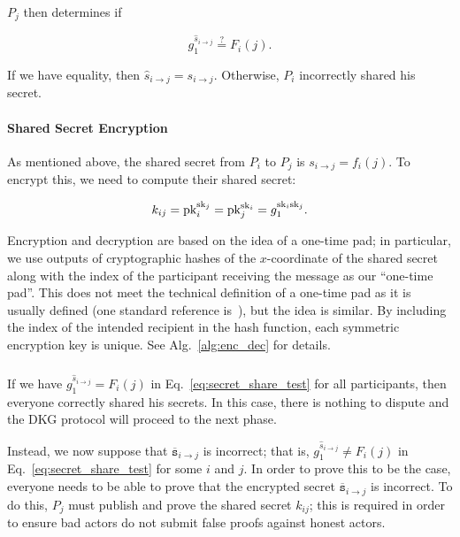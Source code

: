 \noindent
$P_{j}$ then determines if

\begin{equation}
    g_{1}^{\hat{s}_{i\to j}} \overset{?}{=} F_{i}(j).
    \label{eq:secret_share_test}
\end{equation}

\noindent
If we have equality, then $\hat{s}_{i\to j} = s_{i\to j}$.
Otherwise, $P_{i}$ incorrectly shared his secret.

\paragraph{Shared Secret Encryption}
\label{par:secret_enc}

As mentioned above, the shared secret from
$P_{i}$ to $P_{j}$ is $s_{i\to j} = f_{i}(j)$.
To encrypt this, we need to compute their shared secret:

\begin{equation}
    k_{ij} = \textrm{pk}_{i}^{\textrm{sk}_{j}} = \textrm{pk}_{j}^{\textrm{sk}_{i}} =
    g_{1}^{\textrm{sk}_{i}\textrm{sk}_{j}}.
\end{equation}

\noindent
Encryption and decryption are based on the idea of a one-time pad;
in particular, we use outputs of cryptographic hashes of
the $x$-coordinate of the shared secret along with the index
of the participant receiving the message as our ``one-time pad''.
This does not meet the technical definition of a one-time pad
as it is usually defined (one standard reference is~\cite{hac1996}),
but the idea is similar.
By including the index of the intended recipient in the hash function,
each symmetric encryption key is unique.
See Alg.~\ref{alg:enc_dec} for details.





\subsubsection{\ShareDistributionDispute{}}
If we have $g_{1}^{\hat{s}_{i\to j}} = F_{i}(j)$
in Eq.~\eqref{eq:secret_share_test} for all participants,
then everyone correctly shared his secrets.
In this case, there is nothing to dispute and the DKG protocol
will proceed to the next phase.

Instead, we now suppose that $\overline{\texttt{s}}_{i\to j}$ is incorrect;
that is, $g_{1}^{\hat{s}_{i\to j}} \ne F_{i}(j)$
in Eq.~\eqref{eq:secret_share_test} for some $i$ and $j$.
In order to prove this to be the case, everyone needs to be
able to prove that the encrypted secret
$\overline{\texttt{s}}_{i\to j}$ is incorrect.
To do this, $P_{j}$ must publish and prove the shared secret $k_{ij}$;
this is required in order to ensure bad actors
do not submit false proofs against honest actors.

